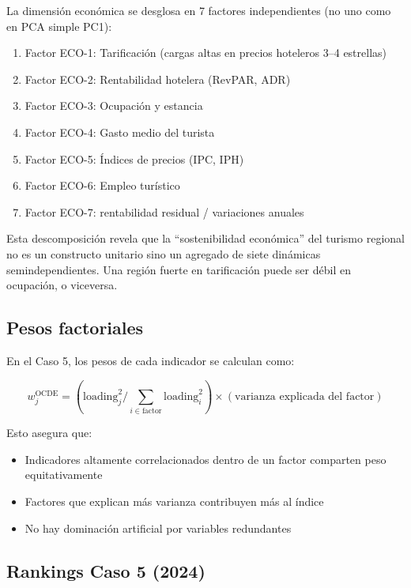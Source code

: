 La dimensión económica se desglosa en 7 factores independientes (no uno como en PCA simple PC1):

\begin{enumerate}
    \item Factor ECO-1: Tarificación (cargas altas en precios hoteleros 3--4 estrellas)
    \item Factor ECO-2: Rentabilidad hotelera (RevPAR, ADR)
    \item Factor ECO-3: Ocupación y estancia
    \item Factor ECO-4: Gasto medio del turista
    \item Factor ECO-5: Índices de precios (IPC, IPH)
    \item Factor ECO-6: Empleo turístico
    \item Factor ECO-7: rentabilidad residual / variaciones anuales
\end{enumerate}

Esta descomposición revela que la ``sostenibilidad económica'' del turismo regional no es un constructo unitario sino un agregado de siete dinámicas semindependientes. Una región fuerte en tarificación puede ser débil en ocupación, o viceversa.

\subsection{Pesos factoriales}

En el Caso 5, los pesos de cada indicador se calculan como:

\begin{equation}
    w_j^{\text{OCDE}} = (\text{loading}_j^2 / \sum_{i \in \text{factor}} \text{loading}_i^2) \times (\text{varianza explicada del factor})
\end{equation}

Esto asegura que:
\begin{itemize}
    \item Indicadores altamente correlacionados dentro de un factor comparten peso equitativamente
    \item Factores que explican más varianza contribuyen más al índice
    \item No hay dominación artificial por variables redundantes
\end{itemize}

\subsection{Rankings Caso 5 (2024)}

